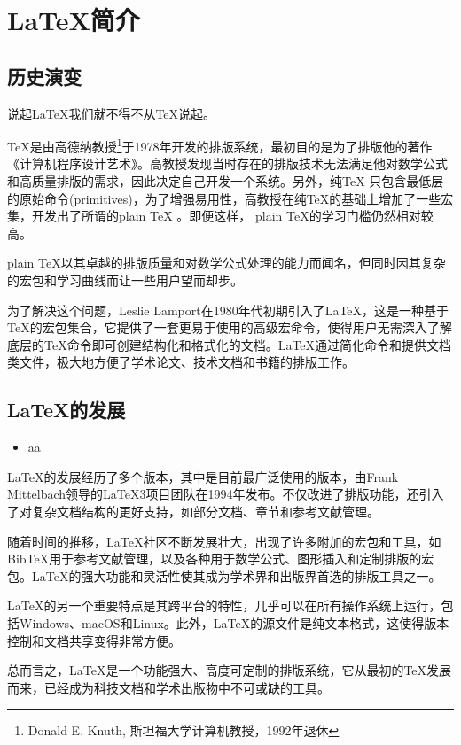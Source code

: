 \chapter{\LaTeX  简介}
\section{历史演变}
说起\LaTeX 我们就不得不从\TeX 说起。

\TeX 是由高德纳教授\footnote{Donald E. Knuth,
	斯坦福大学计算机教授，1992年退休}于1978年开发的排版系统，最初目的是为了排版他的著作《计算机程序设计艺术》。高教授发现当时存在的排版技术无法满足他对数学公式和高质量排版的需求，因此决定自己开发一个系统。另外，纯\TeX
只包含最低层的原始命令(primitives)，为了增强易用性，高教授在纯\TeX 的基础上增加了一些宏集，开发出了所谓的plain \TeX
。即便这样，
plain \TeX 的学习门槛仍然相对较高。

plain \TeX 以其卓越的排版质量和对数学公式处理的能力而闻名，但同时因其复杂的宏包和学习曲线而让一些用户望而却步。

为了解决这个问题，Leslie Lamport在1980年代初期引入了\LaTeX ，这是一种基于\TeX 的宏包集合，它提供了一套更易于使用的高级宏命令，使得用户无需深入了解底层的\TeX 命令即可创建结构化和格式化的文档。\LaTeX 通过简化命令和提供文档类文件，极大地方便了学术论文、技术文档和书籍的排版工作。

\section{\LaTeX 的发展}
\begin{itemize}
	\item aa

\end{itemize}
\LaTeX 的发展经历了多个版本，其中\LaTeXe 是目前最广泛使用的版本，由Frank Mittelbach领导的\LaTeX 3项目团队在1994年发布。\LaTeXe 不仅改进了排版功能，还引入了对复杂文档结构的更好支持，如部分文档、章节和参考文献管理。

随着时间的推移，\LaTeX 社区不断发展壮大，出现了许多附加的宏包和工具，如BibTeX用于参考文献管理，以及各种用于数学公式、图形插入和定制排版的宏包。\LaTeX 的强大功能和灵活性使其成为学术界和出版界首选的排版工具之一。

\LaTeX 的另一个重要特点是其跨平台的特性，几乎可以在所有操作系统上运行，包括Windows、macOS和Linux。此外，\LaTeX 的源文件是纯文本格式，这使得版本控制和文档共享变得非常方便。

总而言之，\LaTeX 是一个功能强大、高度可定制的排版系统，它从最初的\TeX 发展而来，已经成为科技文档和学术出版物中不可或缺的工具。


